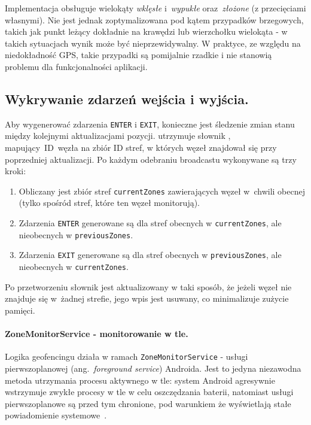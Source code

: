 Implementacja obsługuje wielokąty \emph{wklęsłe} i~\emph{wypukłe} oraz~\emph{złożone} (z przecięciami własnymi). 
Nie jest jednak zoptymalizowana pod kątem przypadków brzegowych, takich jak punkt leżący dokładnie na krawędzi 
lub wierzchołku wielokąta - w takich sytuacjach wynik może być nieprzewidywalny. W praktyce, ze względu na 
niedokładność GPS, takie przypadki są pomijalnie rzadkie i nie stanowią problemu dla funkcjonalności aplikacji.

\subsection*{Wykrywanie zdarzeń wejścia i wyjścia.}

Aby wygenerować zdarzenia \texttt{ENTER} i \texttt{EXIT}, konieczne jest śledzenie
zmian stanu między kolejnymi aktualizacjami pozycji.
\texttt{} utrzymuje słownik \texttt{},
mapujący~ID~węzła na zbiór ID stref, w których węzeł znajdował się przy poprzedniej
aktualizacji. Po każdym odebraniu broadcastu \texttt{} wykonywane są trzy kroki:

\begin{enumerate}
    \item Obliczany jest zbiór stref \texttt{currentZones} zawierających węzeł
          w~chwili obecnej (tylko spośród stref, które ten węzeł monitorują).
    \item Zdarzenia \texttt{ENTER} generowane są dla stref obecnych w \texttt{currentZones},
          ale nieobecnych w \texttt{previousZones}.
    \item Zdarzenia \texttt{EXIT} generowane są dla stref obecnych w \texttt{previousZones},
          ale nieobecnych w \texttt{currentZones}.
\end{enumerate}

Po przetworzeniu słownik jest aktualizowany w taki sposób, że jeżeli węzeł nie znajduje się w~żadnej strefie,
jego wpis jest usuwany, co minimalizuje zużycie pamięci.

\paragraph{ZoneMonitorService - monitorowanie w tle.}

Logika geofencingu działa w ramach \texttt{ZoneMonitor\-Service} - usługi pierwszoplanowej
(ang.\ \textit{foreground service}) Androida. Jest to jedyna niezawodna metoda utrzymania
procesu aktywnego w tle: system Android agresywnie wstrzymuje zwykłe procesy w tle w celu
oszczędzania baterii, natomiast usługi pierwszoplanowe są przed tym chronione, pod warunkiem
że wyświetlają stałe powiadomienie systemowe~\cite{android-foreground-service}.

